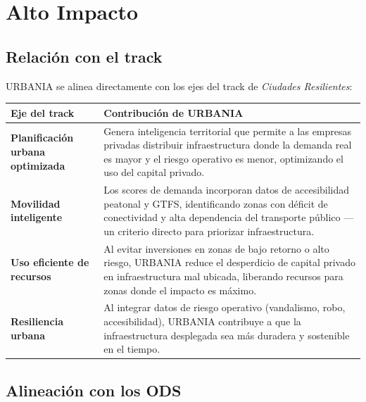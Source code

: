 \documentclass[12pt,a4paper]{article}
\begin{document}
\newpage
\section{Alto Impacto}

\subsection{Relación con el track}

URBANIA se alinea directamente con los ejes del track de \textit{Ciudades Resilientes}:

\begin{table}[H]
\centering
\small
\renewcommand{\arraystretch}{1.3}
\begin{tabularx}{\textwidth}{>{\bfseries}l X}
\toprule
\rowcolor{grisoscuro}
\color{white}\textbf{Eje del track} & \color{white}\textbf{Contribución de URBANIA} \\
\midrule
Planificación urbana optimizada & Genera inteligencia territorial que permite a las empresas privadas distribuir infraestructura donde la demanda real es mayor y el riesgo operativo es menor, optimizando el uso del capital privado. \\
\rowcolor{fondofila}
Movilidad inteligente & Los scores de demanda incorporan datos de accesibilidad peatonal y GTFS, identificando zonas con déficit de conectividad y alta dependencia del transporte público — un criterio directo para priorizar infraestructura. \\
Uso eficiente de recursos & Al evitar inversiones en zonas de bajo retorno o alto riesgo, URBANIA reduce el desperdicio de capital privado en infraestructura mal ubicada, liberando recursos para zonas donde el impacto es máximo. \\
\rowcolor{fondofila}
Resiliencia urbana & Al integrar datos de riesgo operativo (vandalismo, robo, accesibilidad), URBANIA contribuye a que la infraestructura desplegada sea más duradera y sostenible en el tiempo. \\
\bottomrule
\end{tabularx}
\end{table}

\subsection{Alineación con los ODS}
\end{document}
